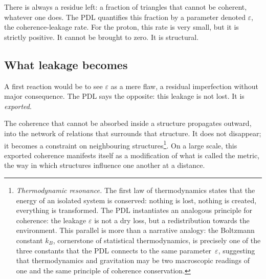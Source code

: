 \documentclass[12pt, a4paper, openright]{book}
\begin{document}
\medskip

There is always a residue left: a fraction of triangles that cannot be coherent, whatever one does. The PDL quantifies this fraction by a parameter denoted $\varepsilon$, the coherence-leakage rate. For the proton, this rate is very small, but it is strictly positive. It cannot be brought to zero. It is structural.

\subsection*{What leakage becomes}

A first reaction would be to see $\varepsilon$ as a mere flaw, a residual imperfection without major consequence. The PDL says the opposite: this leakage is not lost. It is \emph{exported}.

\medskip

The coherence that cannot be absorbed inside a structure propagates outward, into the network of relations that surrounds that structure. It does not disappear; it becomes a constraint on neighbouring structures\footnote{\textit{Thermodynamic resonance.} The first law of thermodynamics states that the energy of an isolated system is conserved: nothing is lost, nothing is created, everything is transformed. The PDL instantiates an analogous principle for coherence: the leakage $\varepsilon$ is not a dry loss, but a redistribution towards the environment. This parallel is more than a narrative analogy: the Boltzmann constant $k_B$, cornerstone of statistical thermodynamics, is precisely one of the three constants that the PDL connects to the same parameter~$\varepsilon$, suggesting that thermodynamics and gravitation may be two macroscopic readings of one and the same principle of coherence conservation.}. On a large scale, this exported coherence manifests itself as a modification of what is called the metric, the way in which structures influence one another at a distance.

\medskip
\end{document}
